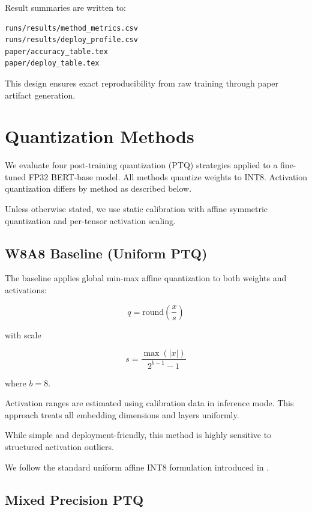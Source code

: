 \documentclass[conference]{IEEEtran}
\begin{document}
Result summaries are written to:

\begin{verbatim}
runs/results/method_metrics.csv
runs/results/deploy_profile.csv
paper/accuracy_table.tex
paper/deploy_table.tex
\end{verbatim}

This design ensures exact reproducibility from raw training through paper artifact generation.

\section{Quantization Methods}

We evaluate four post-training quantization (PTQ) strategies applied to a fine-tuned FP32 BERT-base model. All methods quantize weights to INT8. Activation quantization differs by method as described below.

Unless otherwise stated, we use static calibration with affine symmetric quantization and per-tensor activation scaling.

\subsection{W8A8 Baseline (Uniform PTQ)}

The baseline applies global min-max affine quantization to both weights and activations:

\begin{equation}
q = \mathrm{round}\left(\frac{x}{s}\right)
\end{equation}

with scale

\begin{equation}
s = \frac{\max(|x|)}{2^{b-1}-1}
\end{equation}

where $b=8$.

Activation ranges are estimated using calibration data in inference mode. This approach treats all embedding dimensions and layers uniformly.

While simple and deployment-friendly, this method is highly sensitive to structured activation outliers.

We follow the standard uniform affine INT8 formulation introduced in \cite{jacob2018quantization}.

\subsection{Mixed Precision PTQ}
\end{document}
